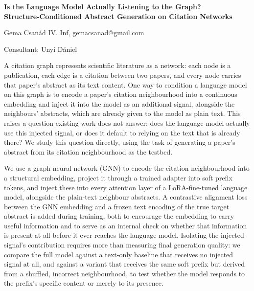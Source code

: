 \documentclass[12pt]{article}
\begin{document}
\begin{center}
    {\Large\bfseries Is the Language Model Actually Listening to the Graph? \\
    Structure-Conditioned Abstract Generation on Citation Networks}
\end{center}

\vspace{0.8em}

\begin{center}
    Gema Csanád IV. Inf, gemacsanad@gmail.com \\

\end{center}

\vspace{0.4em}

\begin{center}
    Consultant: Unyi Dániel
\end{center}

\vspace{1.2em}


A citation graph represents scientific literature as a network: each
node is a publication, each edge is a citation between two papers,
and every node carries that paper's abstract as its text content. One
way to condition a language model on this graph is to encode a
paper's citation neighbourhood into a continuous embedding and inject
it into the model as an additional signal, alongside the neighbours'
abstracts, which are already given to the model as plain text. This
raises a question existing work does not answer: does the language
model actually use this injected signal, or does it default to
relying on the text that is already there? We study this question
directly, using the task of generating a paper's abstract from its
citation neighbourhood as the testbed.

We use a graph neural network (GNN) to encode the citation
neighbourhood into a structural embedding, project it through a
trained adapter into soft prefix tokens, and inject these into every
attention layer of a LoRA-fine-tuned language model, alongside the
plain-text neighbour abstracts. A contrastive alignment loss between
the GNN embedding and a frozen text encoding of the true target
abstract is added during training, both to encourage the embedding to
carry useful information and to serve as an internal check on whether
that information is present at all before it ever reaches the
language model. Isolating the injected signal's contribution requires
more than measuring final generation quality: we compare the full
model against a text-only baseline that receives no injected signal
at all, and against a variant that receives the same soft prefix but
derived from a shuffled, incorrect neighbourhood, to test whether the
model responds to the prefix's specific content or merely to its
presence.
\end{document}
